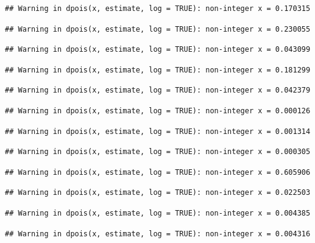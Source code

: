 \documentclass[]{article}
\begin{document}
\begin{verbatim}
## Warning in dpois(x, estimate, log = TRUE): non-integer x = 0.170315
\end{verbatim}

\begin{verbatim}
## Warning in dpois(x, estimate, log = TRUE): non-integer x = 0.230055
\end{verbatim}

\begin{verbatim}
## Warning in dpois(x, estimate, log = TRUE): non-integer x = 0.043099
\end{verbatim}

\begin{verbatim}
## Warning in dpois(x, estimate, log = TRUE): non-integer x = 0.181299
\end{verbatim}

\begin{verbatim}
## Warning in dpois(x, estimate, log = TRUE): non-integer x = 0.042379
\end{verbatim}

\begin{verbatim}
## Warning in dpois(x, estimate, log = TRUE): non-integer x = 0.000126
\end{verbatim}

\begin{verbatim}
## Warning in dpois(x, estimate, log = TRUE): non-integer x = 0.001314
\end{verbatim}

\begin{verbatim}
## Warning in dpois(x, estimate, log = TRUE): non-integer x = 0.000305
\end{verbatim}

\begin{verbatim}
## Warning in dpois(x, estimate, log = TRUE): non-integer x = 0.605906
\end{verbatim}

\begin{verbatim}
## Warning in dpois(x, estimate, log = TRUE): non-integer x = 0.022503
\end{verbatim}

\begin{verbatim}
## Warning in dpois(x, estimate, log = TRUE): non-integer x = 0.004385
\end{verbatim}

\begin{verbatim}
## Warning in dpois(x, estimate, log = TRUE): non-integer x = 0.004316
\end{verbatim}
\end{document}
